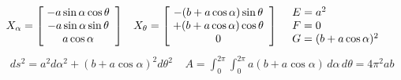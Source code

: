 \begin{align*}
X_\alpha= 
    \left[
\hspace{-12pt}
\begin{array}{ccc}
     & -a\sin\alpha\cos\theta\\
     &-a\sin\alpha\sin\theta\\
     &a\cos\alpha
\end{array}
\right]\; \;\;
 X_\theta= 
    \left[
\hspace{-12pt}
\begin{array}{ccc}
     & -(b+a\cos\alpha)\sin\theta\\
     &+(b+a\cos\alpha)\cos\theta\\
     &0
\end{array}
\right]\; \; \; 
    \left.
\hspace{-12pt}
\begin{array}{lll}
     & E=a^2 \\
     &F=0\\
     &G=(b+a\cos\alpha)^2
\end{array}
\right.
\end{align*}
\begin{align*}
    &ds^2 = a^2 d\alpha^2 + (b+a\cos\alpha)^2 d\theta^2 \; \; \;\; A = \int_{0}^{2\pi}\int_{0}^{2\pi}a(b+a\cos\alpha)\,d\alpha\,d\theta= 4\pi^2  ab
\end{align*}
